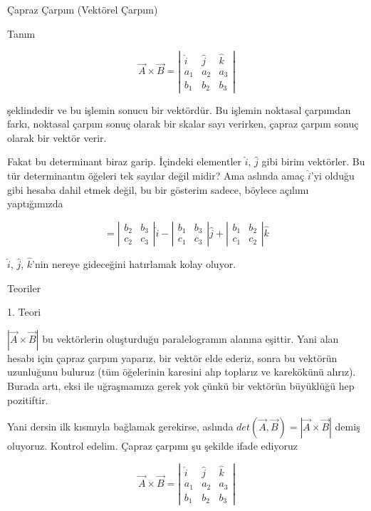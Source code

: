 \documentclass[12pt,fleqn]{article}\usepackage{../../common}
\begin{document}
Çapraz Çarpım (Vektörel Çarpım)

Tanım

$$ \vec{A} \times \vec{B} =
\left|\begin{array}{rrr}
\hat{i}& \hat{j}& \hat{k} \\
a_1 & a_2 & a_3 \\
b_1 & b_2 & b_3 
\end{array}\right|
 $$

şeklindedir ve bu işlemin sonucu bir vektördür. Bu işlemin noktasal çarpımdan 
farkı, noktasal çarpım sonuç olarak bir skalar sayı verirken, çapraz çarpım 
sonuç olarak bir vektör verir.

Fakat bu determinant biraz garip. İçindeki elementler $\hat{i}$, $\hat{j}$ gibi
birim vektörler. Bu tür determinantın öğeleri tek sayılar değil midir?  Ama
aslında amaç $\hat{i}$'yi olduğu gibi hesaba dahil etmek değil, bu bir gösterim
sadece, böylece açılımı yaptığımızda

$$ = 
\left|\begin{array}{rr}
b_2 & b_3 \\
c_2 & c_3
\end{array}\right| 
\hat{i}
-
\left|\begin{array}{rr}
b_1 & b_3 \\
c_1 & c_3
\end{array}\right|
\hat{j}
+
\left|\begin{array}{rr}
b_1 & b_2 \\
c_1 & c_2
\end{array}\right|
\hat{k}
$$

$\hat{i}$, $\hat{j}$, $\hat{k}$'nin nereye gideceğini hatırlamak kolay oluyor.

Teoriler

1. Teori

$|\vec{A} \times \vec{B}|$ bu vektörlerin oluşturduğu paralelogramın alanına
eşittir. Yani alan hesabı için çapraz çarpım yaparız, bir vektör elde ederiz,
sonra bu vektörün uzunluğunu buluruz (tüm öğelerinin karesini alıp toplarız ve
karekökünü alırız). Burada artı, eksi ile uğraşmamıza gerek yok çünkü bir
vektörün büyüklüğü hep pozitiftir.

Yani dersin ilk kısmıyla bağlamak gerekirse, aslında $det(\vec{A},\vec{B}) =
|\vec{A} \times \vec{B}|$ demiş oluyoruz. Kontrol edelim. Çapraz çarpımı şu 
şekilde ifade ediyoruz

$$ \vec{A} \times \vec{B} =
\left|\begin{array}{rrr}
\hat{i}& \hat{j}& \hat{k} \\
a_1 & a_2 & a_3 \\
b_1 & b_2 & b_3 
\end{array}\right|
 $$
\end{document}
